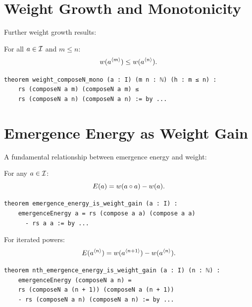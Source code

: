 \section{Weight Growth and Monotonicity}

Further weight growth results:

\begin{theorem}
\label{thm:weight-composeN-mono}
For all $a \in \mathcal{I}$ and $m \leq n$:
\[
  w(a^{\langle m \rangle}) \leq w(a^{\langle n \rangle}).
\]
\end{theorem}

\begin{lstlisting}[caption={Weight monotonicity (IDT\_v3\_Emergence.lean)}]
theorem weight_composeN_mono (a : I) (m n : ℕ) (h : m ≤ n) :
    rs (composeN a m) (composeN a m) ≤
    rs (composeN a n) (composeN a n) := by ...
\end{lstlisting}


\section{Emergence Energy as Weight Gain}

A fundamental relationship between emergence energy and weight:

\begin{theorem}
\label{thm:emergence-energy-is-weight-gain}
For any $a \in \mathcal{I}$:
\[
  E(a) = w(a \circ a) - w(a).
\]
\end{theorem}

\begin{lstlisting}[caption={Energy is weight gain (IDT\_v3\_Emergence.lean)}]
theorem emergence_energy_is_weight_gain (a : I) :
    emergenceEnergy a = rs (compose a a) (compose a a)
      - rs a a := by ...
\end{lstlisting}

\begin{theorem}
\label{thm:nth-emergence-energy}
For iterated powers:
\[
  E(a^{\langle n \rangle}) = w(a^{\langle n+1 \rangle}) - w(a^{\langle n \rangle}).
\]
\end{theorem}

\begin{lstlisting}[caption={N-th energy (IDT\_v3\_Emergence.lean)}]
theorem nth_emergence_energy_is_weight_gain (a : I) (n : ℕ) :
    emergenceEnergy (composeN a n) =
    rs (composeN a (n + 1)) (composeN a (n + 1))
    - rs (composeN a n) (composeN a n) := by ...
\end{lstlisting}


